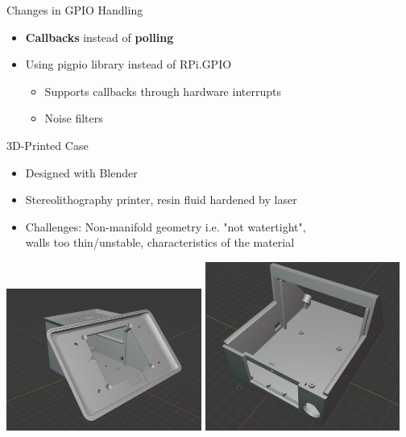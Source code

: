 \documentclass[t]{beamer}
\begin{document}
\begin{frame}{Changes in GPIO Handling}
    \huge
    \begin{itemize}
        \item \textbf{\textcolor{KITgreen}{Callbacks}} instead of \textbf{\textcolor{KITgreen}{polling}}
        \item Using pigpio library instead of RPi.GPIO
              \begin{itemize}
                  \item Supports callbacks through hardware interrupts
                  \item Noise filters
              \end{itemize}
    \end{itemize}
\end{frame}

\begin{frame}{3D-Printed Case}
    \begin{itemize}
        \item Designed with Blender
        \item Stereolithography printer, resin fluid hardened by laser
        \item Challenges: Non-manifold geometry i.e. "not watertight", \\walls too thin/unstable, characteristics of the material
    \end{itemize}
    \begin{center}
        \includegraphics[trim={5cm 1cm 2.5cm 2.4cm},clip,width=0.48\textwidth]{../thesis/images/new-front.png}
        \includegraphics[width=0.48\textwidth]{../thesis/images/new-rear-bottom.png}
    \end{center}
\end{frame}
\end{document}
